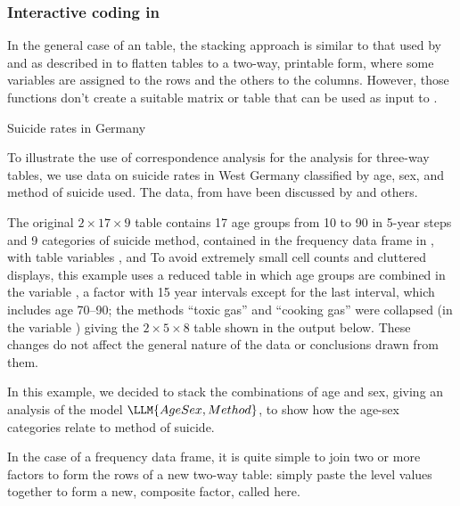 \documentclass[11pt]{book}
\begin{document}
\subsubsection{Interactive coding in \R}
In the general case of an \nway table, the stacking approach
is similar to that used by  and 
as described in  to flatten \mway tables to a two-way,
printable form, where some variables are assigned to the rows and the
others to the columns. However, those functions don't create a suitable
matrix or table that can be used as input to .


\begin{Example}[suicide1]{Suicide rates in Germany}

To illustrate the use of correspondence analysis for the analysis for
three-way tables, we use data on suicide rates in West Germany
classified by age, sex, and method of suicide used.  The data, from
\citet[Table 1]{Heuer:79}
have been discussed by
\citet{Friendly:91,Friendly:94a,HeijdenLeeuw:85}
and others.

The original \(2
\times  17 \times  9\) table contains 17 age groups from 10 to 90 in
5-year steps and 9 categories of suicide method, contained in the
frequency data frame  in , with
table variables ,  and 
To avoid extremely
small cell counts and cluttered displays,
this example uses a reduced table in which age
groups are combined in the variable , a factor
with 15 year intervals except for the last
interval, which includes age 70--90; 
the methods ``toxic gas'' and
``cooking gas'' were collapsed (in the variable )
giving the \(2 \times  5 \times  8\) table shown 
in the output below.
These changes do not affect the general
nature of the data or conclusions drawn from them.

In this example, we decided to stack the combinations of
age and sex, giving an analysis of the \loglin model
$\LLM{AgeSex, Method}$, to show how the age-sex categories
relate to method of suicide.

In the case of a frequency data frame, it is quite simple to
join two or more factors to form the rows of a new two-way table:
simply paste the level values together to form a new, composite
factor, called  here.


\end{Example}
\end{document}
